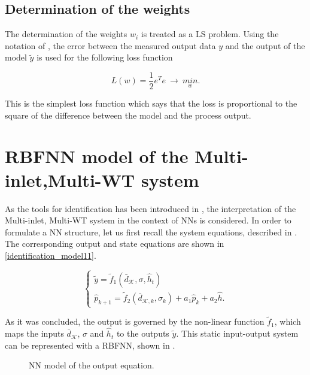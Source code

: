 \subsection{Determination of the weights}
\label{determination_weights} 

The determination of the weights $w_i$ is treated as a LS problem. Using the notation of , the error between the measured output data $y$ and the output of the model $\tilde{y}$ is used for the following loss function

 \begin{equation}
\label{loss_function}
L(w) = \frac{1}{2} e^Te \ \rightarrow \ \underset{w}{min}. 
\end{equation}

This is the simplest loss function which says that the loss is proportional to the square of the difference between the model and the process output. 

\section{RBFNN model of the Multi-inlet,Multi-WT system}
\label{RBFNN_model_multi_inlet_multi_WT_sys} 

As the tools for identification has been introduced in  , the interpretation of the Multi-inlet, Multi-WT system in the context of NNs is considered. In order to formulate a NN structure, let us first recall the system equations, described in . The corresponding output and state equations are shown in \eqref{identification_model11}. 

\begin{equation}
\begin{cases}
  \label{identification_model11}
    \tilde{y}  = \tilde{f}_1(\bar{d}_{\mathcal{K}}, \sigma, \hat{h}_t )\\
  \hat{p}_{k+1} = \tilde{f}_2(\bar{d}_{\mathcal{K},k}, \sigma_k) + a_1 \hat{p}_k + a_2 \hat{h} .
  \end{cases}
\end{equation} 

As it was concluded, the output is governed by the non-linear function $\tilde{f}_1$, which maps the inputs $\bar{d}_{\mathcal{K}}$, $\sigma$ and $\hat{h}_t $ to the outputs $\tilde{y}$. This static input-output system can be represented with a RBFNN, shown in .

 \begin{figure}[H]
 \centering
  
  \vspace{-7mm}
 \caption{NN model of the output equation.}
 \label{fig:nn_output}
 \end{figure}

